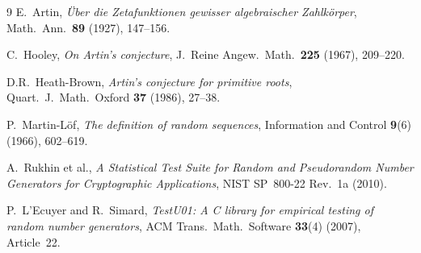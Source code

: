 \documentclass[11pt]{article}
\theoremstyle{definition}
\theoremstyle{remark}
\begin{document}
\begin{thebibliography}{9}
E.~Artin,
\emph{\"Uber die Zetafunktionen gewisser algebraischer Zahlk\"orper},
Math.\ Ann.\ \textbf{89} (1927), 147--156.

C.~Hooley,
\emph{On Artin's conjecture},
J.~Reine Angew.\ Math.\ \textbf{225} (1967), 209--220.

D.R.~Heath-Brown,
\emph{Artin's conjecture for primitive roots},
Quart.\ J.\ Math.\ Oxford \textbf{37} (1986), 27--38.

P.~Martin-L\"of,
\emph{The definition of random sequences},
Information and Control \textbf{9}(6) (1966), 602--619.

A.~Rukhin et al.,
\emph{A Statistical Test Suite for Random and Pseudorandom
Number Generators for Cryptographic Applications},
NIST SP~800-22 Rev.~1a (2010).

P.~L'Ecuyer and R.~Simard,
\emph{TestU01: A C library for empirical testing of
random number generators},
ACM Trans.\ Math.\ Software \textbf{33}(4) (2007), Article~22.
\end{thebibliography}
\end{document}
